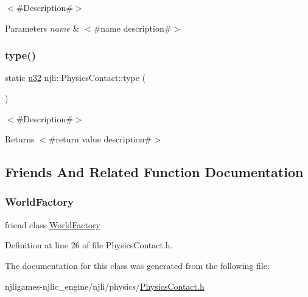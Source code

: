 $<$\#\+Description\#$>$


\begin{DoxyParams}{Parameters}
{\em name} & $<$\#name description\#$>$ \\
\hline
\end{DoxyParams}
\mbox{\label{classnjli_1_1_physics_contact_a417122aab7713317bc18da3d3f6a3bbf}} 
\subsubsection{\texorpdfstring{type()}{type()}}
{\footnotesize\ttfamily static \mbox{\hyperlink{_util_8h_a10e94b422ef0c20dcdec20d31a1f5049}{u32}} njli\+::\+Physics\+Contact\+::type (\begin{DoxyParamCaption}{ }\end{DoxyParamCaption})\hspace{0.3cm}{\ttfamily [static]}}

$<$\#\+Description\#$>$

\begin{DoxyReturn}{Returns}
$<$\#return value description\#$>$ 
\end{DoxyReturn}


\subsection{Friends And Related Function Documentation}
\mbox{\label{classnjli_1_1_physics_contact_acb96ebb09abe8f2a37a915a842babfac}} 
\subsubsection{\texorpdfstring{World\+Factory}{WorldFactory}}
{\footnotesize\ttfamily friend class \mbox{\hyperlink{classnjli_1_1_world_factory}{World\+Factory}}\hspace{0.3cm}{\ttfamily [friend]}}



Definition at line 26 of file Physics\+Contact.\+h.



The documentation for this class was generated from the following file\+:\begin{DoxyCompactItemize}
\item 
njligames-\/njlic\+\_\+engine/njli/physics/\mbox{\hyperlink{_physics_contact_8h}{Physics\+Contact.\+h}}\end{DoxyCompactItemize}
